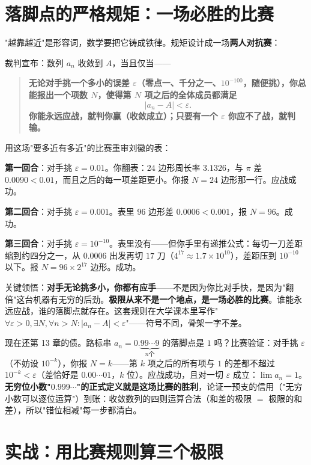 \section{落脚点的严格规矩：一场必胜的比赛}

"越靠越近"是形容词，数学要把它铸成铁律。规矩设计成一场\textbf{两人对抗赛}：

\begin{dingyi}
裁判宣布：数列 $a_n$ 收敛到 $A$，当且仅当——
\begin{quote}
\textbf{无论对手挑一个多小的误差 $\varepsilon$（零点一、千分之一、$10^{-100}$，随便挑），你总能报出一个项数 $N$，使得第 $N$ 项之后的全体成员都满足}
\[
|a_n - A| < \varepsilon .
\]
\textbf{你能永远应战，就判你赢（收敛成立）；只要有一个 $\varepsilon$ 你应不了战，就判输。}
\end{quote}
\end{dingyi}

用这场"要多近有多近"的比赛重审刘徽的表：

\textbf{第一回合}：对手挑 $\varepsilon = 0.01$。你翻表：$24$ 边形周长率 $3.1326$，与 $\pi$ 差 $0.0090 < 0.01$，而且之后的每一项差距更小。你报 $N = 24$ 边形那一行。应战成功。

\textbf{第二回合}：对手挑 $\varepsilon = 0.001$。表里 $96$ 边形差 $0.0006 < 0.001$，报 $N = 96$。成功。

\textbf{第三回合}：对手挑 $\varepsilon = 10^{-10}$。表里没有——但你手里有递推公式：每切一刀差距缩到约四分之一，从 $0.0006$ 出发再切 $17$ 刀（$4^{17} \approx 1.7\times10^{10}$），差距压到 $10^{-10}$ 以下。报 $N = 96\times2^{17}$ 边形。成功。

关键领悟：\textbf{对手无论挑多小，你都有应手}——不是因为你比对手快，是因为"翻倍"这台机器有无穷的后劲。\textbf{极限从来不是一个地点，是一场必胜的比赛}。谁能永远应战，谁的落脚点就存在。这套规则在大学课本里写作"$\forall\varepsilon>0, \exists N, \forall n>N: |a_n - A|<\varepsilon$"——符号不同，骨架一字不差。

现在还第 13 章的债。路标串 $a_n = 0.\underbrace{99\cdots9}_{n\text{个}}$ 的落脚点是 $1$ 吗？比赛验证：对手挑 $\varepsilon$（不妨设 $10^{-k}$），你报 $N = k$——第 $k$ 项之后的所有项与 $1$ 的差都不超过 $10^{-k} < \varepsilon$（差恰好是 $0.00\cdots01$，$k$ 位）。应战成功，且对一切 $\varepsilon$ 成立：$\lim a_n = 1$。\textbf{无穷位小数"$0.999\cdots$"的正式定义就是这场比赛的胜利}，论证一预支的信用（"无穷小数可以逐位运算"）到账：收敛数列的四则运算合法（和差的极限 $=$ 极限的和差），所以"错位相减"每一步都清白。

\section{实战：用比赛规则算三个极限}

